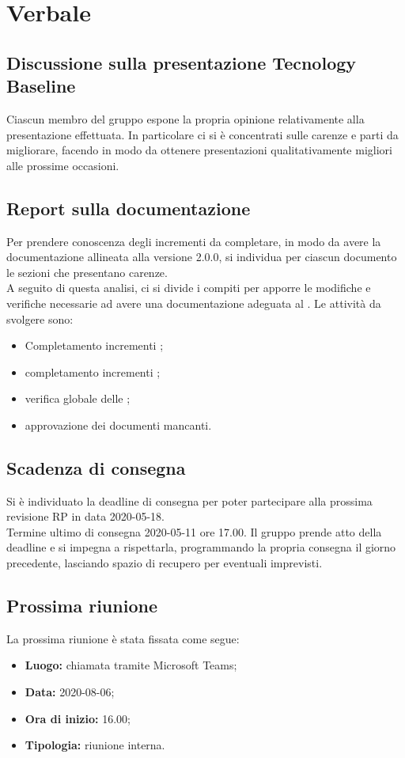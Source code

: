 \section{Verbale}

	\subsection{Discussione sulla presentazione Tecnology Baseline}
		Ciascun membro del gruppo espone la propria opinione relativamente alla presentazione effettuata. In particolare ci si è concentrati sulle carenze e parti da migliorare, facendo in modo da ottenere presentazioni qualitativamente migliori alle prossime occasioni.
	
	
	\subsection{Report sulla documentazione}
		Per prendere conoscenza degli incrementi da completare, in modo da avere la documentazione allineata alla versione 2.0.0, si individua per ciascun documento le sezioni che presentano carenze.\\
		A seguito di questa analisi, ci si divide i compiti per apporre le modifiche e verifiche necessarie ad avere una documentazione adeguata al \PdQ{}. Le attività da svolgere sono:
		\begin{itemize}
			\item Completamento incrementi \PdP;
			\item completamento incrementi \PdQ;
			\item verifica globale delle \NdP;
			\item approvazione dei documenti mancanti.		
		\end{itemize}
	
	
	\subsection{Scadenza di consegna}
		Si è individuato la deadline di consegna per poter partecipare alla prossima revisione RP in data 2020-05-18.\\
		Termine ultimo di consegna 2020-05-11 ore 17.00. Il gruppo prende atto della deadline e si impegna a rispettarla, programmando la propria consegna il giorno precedente, lasciando spazio di recupero per eventuali imprevisti.
		
		
	\subsection{Prossima riunione}
		La prossima riunione è stata fissata come segue:
		\begin{itemize}
			\item \textbf{Luogo: } chiamata tramite Microsoft Teams; 
			\item \textbf{Data: } 2020-08-06;
			\item \textbf{Ora di inizio: } 16.00;
			\item \textbf{Tipologia: } riunione interna.
		\end{itemize}